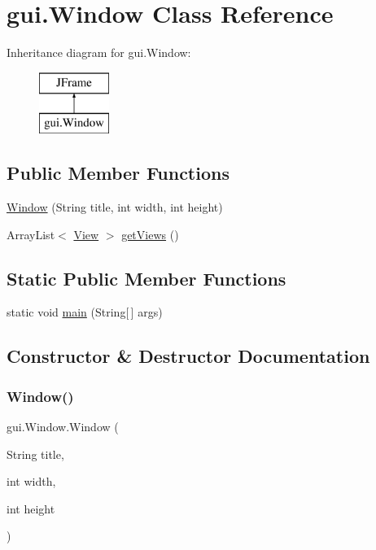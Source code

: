 \hypertarget{classgui_1_1_window}{}\section{gui.\+Window Class Reference}
\label{classgui_1_1_window}
Inheritance diagram for gui.\+Window\+:\begin{figure}[H]
\begin{center}
\leavevmode
\includegraphics[height=2.000000cm]{classgui_1_1_window}
\end{center}
\end{figure}
\subsection*{Public Member Functions}
\begin{DoxyCompactItemize}
\item 
\mbox{\hyperlink{classgui_1_1_window_a0359cbd3edcac6cc55bf35066661717a}{Window}} (String title, int width, int height)
\item 
Array\+List$<$ \mbox{\hyperlink{classgui_1_1views_1_1_view}{View}} $>$ \mbox{\hyperlink{classgui_1_1_window_aaa2b5dbec79b90c40fca41abb1f99707}{get\+Views}} ()
\end{DoxyCompactItemize}
\subsection*{Static Public Member Functions}
\begin{DoxyCompactItemize}
\item 
static void \mbox{\hyperlink{classgui_1_1_window_af859cb601aa2aca9eab24cc3389fa0e4}{main}} (String\mbox{[}$\,$\mbox{]} args)
\end{DoxyCompactItemize}


\subsection{Constructor \& Destructor Documentation}
\mbox{\label{classgui_1_1_window_a0359cbd3edcac6cc55bf35066661717a}} 
\subsubsection{\texorpdfstring{Window()}{Window()}}
{\footnotesize\ttfamily gui.\+Window.\+Window (\begin{DoxyParamCaption}\item[{String}]{title,  }\item[{int}]{width,  }\item[{int}]{height }\end{DoxyParamCaption})\hspace{0.3cm}{\ttfamily [inline]}}

